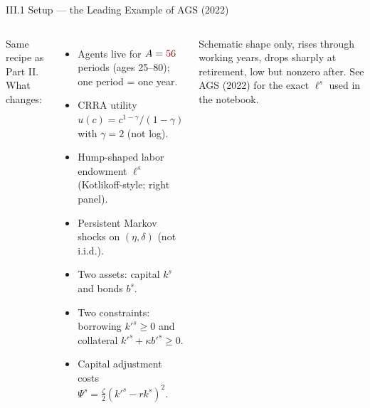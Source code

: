 \documentclass[aspectratio=169,11pt]{beamer}
\newcommand{\emphc}[1]{\textcolor{harvardcrimson}{#1}}
\begin{document}
\begin{frame}{III.1 Setup --- the Leading Example of AGS (2022)}
\small
\begin{columns}[T]
\emphc{Same recipe as Part II.  What changes:}
\begin{itemize}\itemsep1pt
    \item Agents live for $A = \emphc{56}$ periods (ages 25--80); one period = one year.
    \item CRRA utility $u(c) = c^{1-\gamma}/(1-\gamma)$ with $\gamma = 2$ (\emphc{not} log).
    \item \emphc{Hump-shaped labor endowment} $\ell^s$ (Kotlikoff-style; right panel).
    \item \emphc{Persistent} Markov shocks on $(\eta,\delta)$ (not i.i.d.).
    \item \emphc{Two assets}: capital $k^s$ and bonds $b^s$.
    \item \emphc{Two constraints}: borrowing $k'^s \ge 0$ and collateral $k'^s + \kappa b'^s \ge 0$.
    \item Capital adjustment costs $\Psi^s = \tfrac{\zeta}{2}(k'^s - r k^s)^2$.
\end{itemize}

\centering
{}

{\scriptsize \emphc{Schematic shape only}, rises through working years, drops sharply at retirement, low but nonzero after.  See AGS (2022) for the exact $\ell^s$ used in the notebook.}
\end{columns}
\end{frame}
\end{document}
